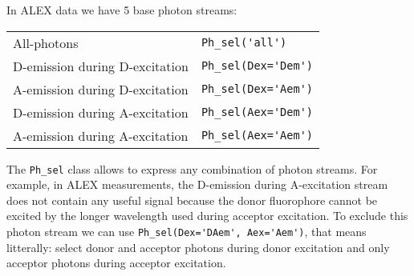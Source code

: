 In ALEX data we have 5 base photon streams: 

\begin{tabular}{l l}
  All-photons & \verb|Ph_sel('all')|\\
  D-emission during D-excitation & \verb|Ph_sel(Dex='Dem')|\\
  A-emission during D-excitation & \verb|Ph_sel(Dex='Aem')|\\
  D-emission during A-excitation & \verb|Ph_sel(Aex='Dem')|\\
  A-emission during A-excitation & \verb|Ph_sel(Aex='Aem')|\\
\end{tabular}

The \verb|Ph_sel| class allows to express any combination of photon streams. For example, in ALEX measurements, the D-emission during A-excitation stream does not contain any useful signal because the donor fluorophore cannot be excited by the longer wavelength used during acceptor excitation. To exclude this photon stream we can use \verb|Ph_sel(Dex='DAem', Aex='Aem')|, that means litterally: select donor and acceptor photons during donor excitation and only acceptor photons during acceptor excitation.